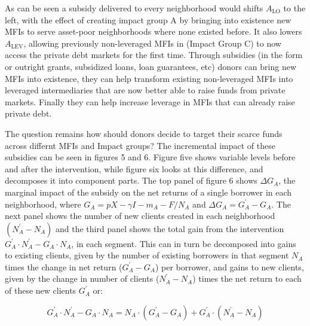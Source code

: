\documentclass[
]{article}
\begin{document}
As can be seen a subsidy delivered to every neighborhood would shifts
\(A_{\text{LO}}\) to the left, with the effect of creating impact group
A by bringing into existence new MFIs to serve asset-poor neighborhoods
where none existed before. It also lowers \(A_{\text{LEV}}\), allowing
previously non-leveraged MFIs in (Impact Group C) to now access the
private debt markets for the first time. Through subsidies (in the form
or outright grants, subsidized loans, loan guarantees, etc) donors can
bring new MFIs into existence, they can help transform existing
non-leveraged MFIs into leveraged intermediaries that are now better
able to raise funds from private markets. Finally they can help increase
leverage in MFIs that can already raise private debt.

The question remains how should donors decide to target their scarce
funds across differnt MFIs and Impact groups? The incremental impact of
these subsidies can be seen in figures 5 and 6. Figure five shows
variable levels before and after the intervention, while figure six
looks at this difference, and decomposes it into component parts. The
top panel of figure 6 shows \(\Delta G_{A}\), the marginal impact of the
subsidy on the net returns of a single borrower in each neighborhood,
where \(G_{A} = pX - \gamma I - m_{A} - F/N_{A}\) and
\(\Delta G_{A} = G_{A}^{'} - G_{A}.\) The next panel shows the number of
new clients created in each neighborhood \((N_{A}^{'} - N_{A})\) and the
third panel shows the total gain from the intervention
\(G_{A}^{'} \cdot N_{A}^{'} - G_{A} \cdot N_{A}\), in each segment. This
can in turn be decomposed into gains to existing clients, given by the
number of existing borrowers in that segment \(N_{A}\) times the change
in net return (\(G_{A}^{'} - G_{A}\)) per borrower, and gains to new
clients, given by the change in number of clients
(\(N_{A}^{'} - N_{A}\)) times the net return to each of these new
clients \(G_{A}^{'}\) or:

\[{G_{A}^{'} \cdot N_{A}^{'} - G_{A} \cdot N_{A}
}{= N_{A} \cdot (G_{A}^{'} - G_{A}) + G_{A}^{'} \cdot (N_{A}^{'} - N_{A})}\]
\end{document}
